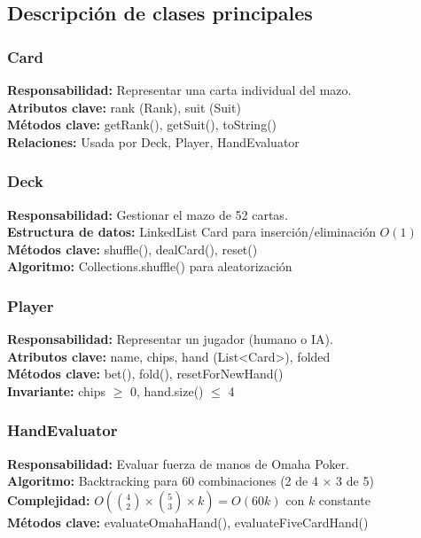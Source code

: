 \documentclass[12pt,a4paper]{article}
\begin{document}
\subsection{Descripción de clases principales}

\subsubsection{Card}
\textbf{Responsabilidad:} Representar una carta individual del mazo. \\
\textbf{Atributos clave:} rank (Rank), suit (Suit) \\
\textbf{Métodos clave:} getRank(), getSuit(), toString() \\
\textbf{Relaciones:} Usada por Deck, Player, HandEvaluator

\subsubsection{Deck}
\textbf{Responsabilidad:} Gestionar el mazo de 52 cartas. \\
\textbf{Estructura de datos:} LinkedList Card para inserción/eliminación $O(1)$ \\
\textbf{Métodos clave:} shuffle(), dealCard(), reset() \\
\textbf{Algoritmo:} Collections.shuffle() para aleatorización

\subsubsection{Player}
\textbf{Responsabilidad:} Representar un jugador (humano o IA). \\
\textbf{Atributos clave:} name, chips, hand (List<Card>), folded \\
\textbf{Métodos clave:} bet(), fold(), resetForNewHand() \\
\textbf{Invariante:} chips $\geq$ 0, hand.size() $\leq$ 4

\subsubsection{HandEvaluator}
\textbf{Responsabilidad:} Evaluar fuerza de manos de Omaha Poker. \\
\textbf{Algoritmo:} Backtracking para 60 combinaciones (2 de 4 × 3 de 5) \\
\textbf{Complejidad:} $O(\binom{4}{2} \times \binom{5}{3} \times k) = O(60k)$ con $k$ constante \\
\textbf{Métodos clave:} evaluateOmahaHand(), evaluateFiveCardHand()
\end{document}
